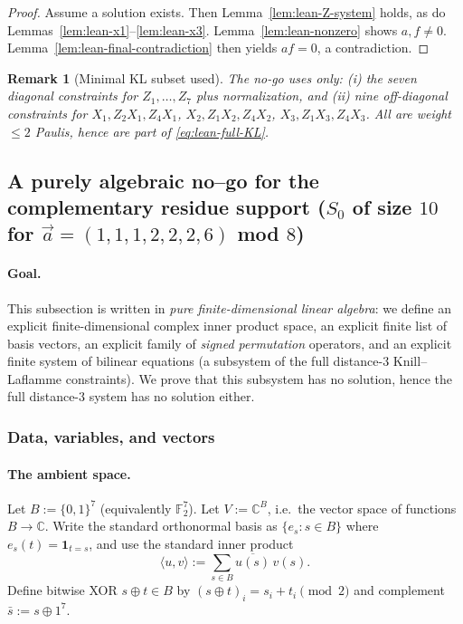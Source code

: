 \documentclass[11pt]{article}
\newtheorem{remark}{Remark}
\begin{document}
\begin{proof}
Assume a solution exists. Then Lemma~\ref{lem:lean-Z-system} holds, as do Lemmas~\ref{lem:lean-x1}--\ref{lem:lean-x3}.
Lemma~\ref{lem:lean-nonzero} shows $a,f\neq 0$.
Lemma~\ref{lem:lean-final-contradiction} then yields $af=0$, a contradiction.
\end{proof}

\begin{remark}[Minimal KL subset used]
The no-go uses only:
(i) the seven diagonal constraints for $Z_1,\dots,Z_7$ plus normalization,
and (ii) nine off-diagonal constraints for
$X_1,Z_2X_1,Z_4X_1$, $X_2,Z_1X_2,Z_4X_2$, $X_3,Z_1X_3,Z_4X_3$.
All are weight $\le 2$ Paulis, hence are part of \eqref{eq:lean-full-KL}.
\end{remark}

\subsection{A purely algebraic no--go for the complementary residue support
($S_0$ of size $10$ for $\vec a=(1,1,1,2,2,2,6)$ mod $8$)}
\label{subsec:pure-math-nogo-1112226}

\paragraph{Goal.}
This subsection is written in \emph{pure finite-dimensional linear algebra}:
we define an explicit finite-dimensional complex inner product space, an explicit finite list of
basis vectors, an explicit family of \emph{signed permutation} operators, and an explicit finite system
of bilinear equations (a subsystem of the full distance-$3$ Knill--Laflamme constraints).
We prove that this subsystem has no solution, hence the full distance-$3$ system has no solution either.

\subsubsection*{Data, variables, and vectors}

\paragraph{The ambient space.}
Let $B:=\{0,1\}^7$ (equivalently $\mathbb F_2^7$).
Let $V:=\mathbb C^{B}$, i.e.\ the vector space of functions $B\to\mathbb C$.
Write the standard orthonormal basis as $\{e_s:s\in B\}$ where $e_s(t)=\mathbf 1_{t=s}$, and
use the standard inner product
\[
\langle u,v\rangle:=\sum_{s\in B}\overline{u(s)}\,v(s).
\]
Define bitwise XOR $s\oplus t\in B$ by $(s\oplus t)_i=s_i+t_i\pmod 2$ and complement $\bar s:=s\oplus 1^7$.
\end{document}
